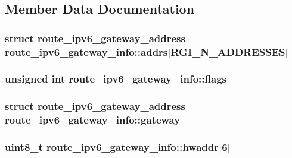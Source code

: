 \subsection{Member Data Documentation}
\hypertarget{structroute__ipv6__gateway__info_a928106f5d2ff749395ecb753510f6b2a}{}
\subsubsection[{addrs}]{\setlength{\rightskip}{0pt plus 5cm}struct {\bf route\+\_\+ipv6\+\_\+gateway\+\_\+address} route\+\_\+ipv6\+\_\+gateway\+\_\+info\+::addrs\mbox{[}{\bf R\+G\+I\+\_\+\+N\+\_\+\+A\+D\+D\+R\+E\+S\+S\+E\+S}\mbox{]}}\label{structroute__ipv6__gateway__info_a928106f5d2ff749395ecb753510f6b2a}
\hypertarget{structroute__ipv6__gateway__info_aa3c518325a4fbd687a94b5eae82612ab}{}
\subsubsection[{flags}]{\setlength{\rightskip}{0pt plus 5cm}unsigned int route\+\_\+ipv6\+\_\+gateway\+\_\+info\+::flags}\label{structroute__ipv6__gateway__info_aa3c518325a4fbd687a94b5eae82612ab}
\hypertarget{structroute__ipv6__gateway__info_a768fd1ce01cd33fb3012f2ad1bbc8e73}{}
\subsubsection[{gateway}]{\setlength{\rightskip}{0pt plus 5cm}struct {\bf route\+\_\+ipv6\+\_\+gateway\+\_\+address} route\+\_\+ipv6\+\_\+gateway\+\_\+info\+::gateway}\label{structroute__ipv6__gateway__info_a768fd1ce01cd33fb3012f2ad1bbc8e73}
\hypertarget{structroute__ipv6__gateway__info_aa963136cb9c72861e2f90b8254fd80fc}{}
\subsubsection[{hwaddr}]{\setlength{\rightskip}{0pt plus 5cm}uint8\+\_\+t route\+\_\+ipv6\+\_\+gateway\+\_\+info\+::hwaddr\mbox{[}6\mbox{]}}\label{structroute__ipv6__gateway__info_aa963136cb9c72861e2f90b8254fd80fc}
\hypertarget{structroute__ipv6__gateway__info_a4f309d5691cfa6b88d760f57695c4df5}{}
